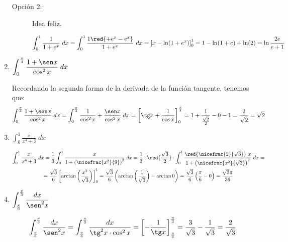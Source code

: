 \begin{ejercicio}
\begin{enumerate}
\begin{description}
            \item[Opción 2:] Idea feliz.
            
            \begin{equation*}
                \int_0^1 \frac{1}{1+e^x}~dx
                = \int_0^1 \frac{1\red{+e^x-e^x}}{1+e^x}~dx
                = \left[x-\ln(1+e^x)\right]_0^1
                = 1-\ln(1+e)+\ln(2) = \ln \frac{2e}{e+1}
            \end{equation*}            
        \end{description}       
        

        \item $\displaystyle \int_0^{\frac{\pi}{4}} \frac{1+\sen x}{\cos^2 x}\;dx$
        
        Recordando la segunda forma de la derivada de la función tangente, tenemos que:
        \begin{equation*}
            \int_0^{\frac{\pi}{4}} \frac{1+\sen x}{\cos^2 x}\;dx
            = \int_0^{\frac{\pi}{4}} \frac{1}{\cos^2 x} + \frac{\sen x}{\cos^2 x}\;dx
            = \left[\tg x + \frac{1}{\cos x}\right]_0^{\frac{\pi}{4}}
            = 1+\frac{1}{\frac{\sqrt{2}}{2}}-0-1 = \frac{2}{\sqrt{2}} = \sqrt{2}
        \end{equation*}

        \item $\displaystyle \int_0^1 \frac{x}{x^4+3}\;dx$
        
        \begin{multline*}
            \int_0^1 \frac{x}{x^4+3}\;dx
            = \frac{1}{3}\int_0^1 \frac{x}{1+\left(\nicefrac{x^2}{9}\right)^2}\;dx
            = \frac{1}{3}\cdot\red{\frac{\sqrt{3}}{2}}\cdot\int_0^1 \frac{\red{\nicefrac{2}{\sqrt{3}}}~x}{1+\left(\nicefrac{x^2}{\sqrt{3}}\right)^2}\;dx
            =\\= \frac{\sqrt{3}}{6}\left[\arctan \left(\frac{x^2}{\sqrt{3}}\right)\right]_0^1
            = \frac{\sqrt{3}}{6}\left(\arctan \left(\frac{1}{\sqrt{3}}\right)-\arctan 0\right)
            = \frac{\sqrt{3}}{6}\left(\frac{\pi}{6}-0\right) = \frac{\sqrt{3}\pi}{36}
        \end{multline*}

        \item $\displaystyle \int_{\frac{\pi}{6}}^{\frac{\pi}{3}} \frac{dx}{\sen^2 x}$
        
        \begin{equation*}
            \int_{\frac{\pi}{6}}^{\frac{\pi}{3}} \frac{dx}{\sen^2 x}
            = \int_{\frac{\pi}{6}}^{\frac{\pi}{3}} \frac{dx}{\tg^2 x \cdot \cos^2 x}
            = \left[-\frac{1}{\tg x}\right]_{\frac{\pi}{6}}^{\frac{\pi}{3}}
            = \frac{3}{\sqrt{3}} - \frac{1}{\sqrt{3}} = \frac{2}{\sqrt{3}}
        \end{equation*}


\end{enumerate}
\end{ejercicio}
